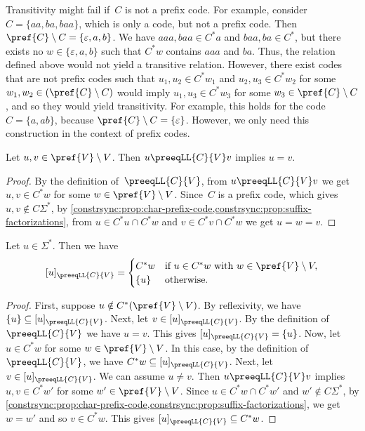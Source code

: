 \begin{remark}
	Transitivity might fail if~$C$ is not a prefix
	code. For example, consider $C = \{aa,ba,baa\}$, which is only a code, but not a prefix code.
	Then $\pref{C} \setminus C = \{\varepsilon, a, b\}$.
	We have $aaa, baa \in C^*a$ and $baa, ba \in C^*$,
	but there exists no $w \in \{\varepsilon,a,b\}$
	such that $C^*w$ contains 
	$aaa$ and $ba$.
	Thus, the relation defined above 
	would not yield a transitive relation.
	However, there exist codes that are not prefix
	codes 
	such that
	$u_1, u_2 \in C^*w_1$ and $u_2, u_3 \in C^*w_2$
	for some $w_1, w_2 \in (\pref{C}\setminus C)$
	would imply $u_1, u_3 \in C^* w_3$ for some $w_3 \in \pref{C} \setminus C$,
	and so they would yield transitivity.
	For example, this holds for the code $C = \{a, ab\}$, 
	because $\pref{C} \setminus C = \{\varepsilon\}$.
	However, we only need this construction in the 
	context of prefix codes.	
\end{remark}

\begin{proposition} \label{constrsync:prop:Cstarw-relation-unique}
	Let $u,v \in \pref{V}\setminus V$.
	Then $u \preeqLL{C}{V} v$
	implies $u = v$.
\end{proposition}
\begin{proof}
	By the definition of~$\preeqLL{C}{V}$,
	from $u \preeqLL{C}{V} v$
	we get $u,v \in C^* w$ for some $w \in \pref{V}\setminus V$.
	Since~$C$ is a prefix code, which gives $u,v \notin C\Sigma^*$, 
	by \cref{constrsync:prop:char-prefix-code,constrsync:prop:suffix-factorizations},
	from $u \in C^* u \cap C^* w$ and $v \in C^* v \cap C^*w$
	we get $u = w = v$.
\end{proof}

\begin{proposition} \label{constrsync:prop:prefix-code-pre-equivalence} 
	Let $u \in \Sigma^*$.
	Then we have
	\[
	[u]_{\preeqLL{C}{V}} =
	\begin{cases}
		C^*w   & \text{if } u \in C^*w \text{ with } w \in \pref{V} \setminus V, \\
		\{u\}  & \text{otherwise.} 
	\end{cases}
	\]
\end{proposition}
\begin{proof}
	First, suppose $u \notin C^* (\pref{V}\setminus V)$.
	By reflexivity, we have $\{u\} \subseteq [u]_{\preeqLL{C}{V}}$.
	Next, let $v \in [u]_{\preeqLL{C}{V}}$.
	By the definition of~$\preeqLL{C}{V}$
	we have $u = v$. This gives $[u]_{\preeqLL{C}{V}} = \{u\}$.
	Now, let $u \in C^* w$ for some $w \in \pref{V}\setminus V$.
	In this case, by the definition of $\preeqLL{C}{V}$,
	we have $C^*w \subseteq [u]_{\preeqLL{C}{V}}$.
	Next, let $v \in [u]_{\preeqLL{C}{V}}$.	
	We can assume $u \ne v$. Then $u \preeqLL{C}{V} v$ implies $u,v \in C^* w'$ for some $w' \in \pref{V}\setminus V$.
	Since $u \in C^*w \cap C^*w'$ and $w' \notin C\Sigma^*$,
	by \cref{constrsync:prop:char-prefix-code,constrsync:prop:suffix-factorizations},
	we get $w = w'$ and so $v \in C^*w$.
	This gives $[u]_{\preeqLL{C}{V}} \subseteq C^* w$.
\end{proof}

